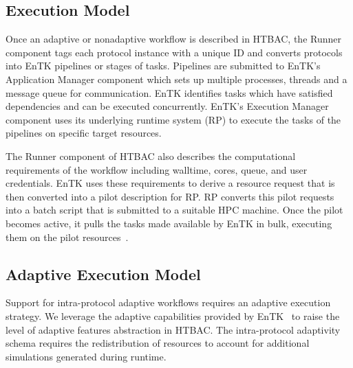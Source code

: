\subsection{Execution Model}

Once an adaptive or nonadaptive workflow is described in HTBAC, the Runner
component tags each protocol instance with a unique ID and converts protocols
into EnTK pipelines or stages of tasks. Pipelines are submitted to EnTK's
Application Manager component which sets up multiple processes, threads and a
message queue for communication. EnTK identifies tasks which have satisfied
dependencies and can be executed concurrently. EnTK's Execution Manager
component uses its underlying runtime system (RP) to execute the tasks of the
pipelines on specific target resources.


The Runner component of HTBAC also describes the computational requirements
of the workflow including walltime, cores, queue, and user credentials. EnTK
uses these requirements to derive a resource request that is then converted
into a pilot description for RP. RP converts this pilot requests into a batch
script that is submitted to a suitable HPC machine. Once the pilot becomes
active, it pulls the tasks made available by EnTK in bulk, executing them on
the pilot resources~\cite{merzky2015radical}.

\subsection{Adaptive Execution Model}

Support for intra-protocol adaptive workflows requires an adaptive execution 
strategy. We leverage the adaptive capabilities provided by 
EnTK~\cite{adaptivebiomolecular} to raise the level of adaptive features 
abstraction in HTBAC. The intra-protocol adaptivity schema requires the 
redistribution of resources to account for additional simulations generated 
during runtime. 


